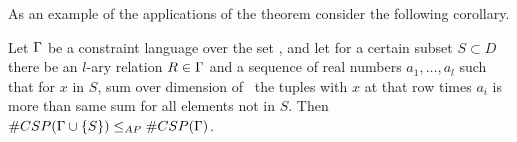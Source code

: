 As an example of the applications of the theorem consider the following corollary. 
\begin{cor}  \label{cor:degree}
Let \(\Gamma\) be a constraint language over the set \mD\@,
and let for a certain subset \(S \subset D\) 
there be an \(l\)-ary relation \(R \in \Gamma\) and a sequence of real numbers
\(a_1,\dotsc ,a_l\) such that for \(x\) in \(S\), sum over dimension of \mR\
the tuples with \(x\) at that row times \(a_i\) is more than same sum for
all elements not in \(S\).
Then \(\#CSP(\Gamma \cup \{{S}\}) \le_{AP} \#CSP(\Gamma)\)\@.
\end{cor}

